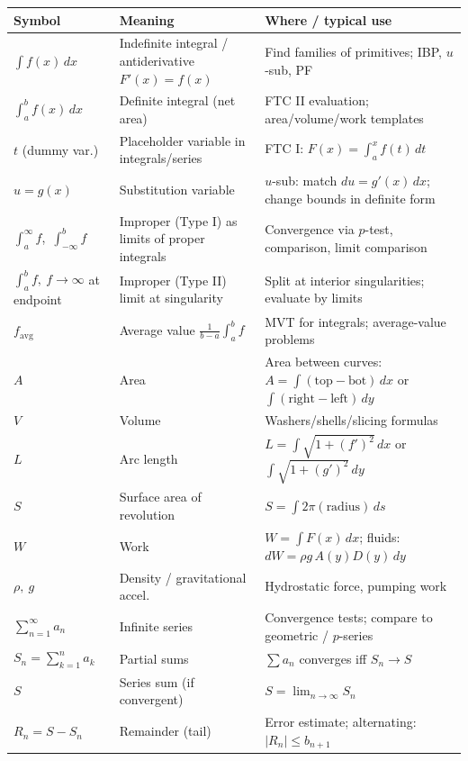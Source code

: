 \documentclass[12pt]{article}
\begin{document}
\begin{center}
\footnotesize
\begin{tabular}{@{}p{}p{}p{}@{}}
\toprule
\textbf{Symbol} & \textbf{Meaning} & \textbf{Where / typical use} \\
\midrule
$\displaystyle \int f(x)\,dx$ & Indefinite integral / antiderivative $F'(x)=f(x)$ & Find families of primitives; IBP, $u$-sub, PF \\
$\displaystyle \int_a^b f(x)\,dx$ & Definite integral (net area) & FTC II evaluation; area/volume/work templates \\
$t$ (dummy var.) & Placeholder variable in integrals/series & FTC I: $F(x)=\int_a^x f(t)\,dt$ \\
$u=g(x)$ & Substitution variable & $u$-sub: match $du=g'(x)\,dx$; change bounds in definite form \\
$\displaystyle \int_a^{\infty} f$,\ $\int_{-\infty}^b f$ & Improper (Type I) as limits of proper integrals & Convergence via $p$-test, comparison, limit comparison \\
$\displaystyle \int_a^b f,\ f\to\infty$ at endpoint & Improper (Type II) limit at singularity & Split at interior singularities; evaluate by limits \\
$f_{\text{avg}}$ & Average value $\frac{1}{b-a}\int_a^b f$ & MVT for integrals; average-value problems \\
$A$ & Area & Area between curves: $A=\int(\text{top}-\text{bot})\,dx$ or $\int(\text{right}-\text{left})\,dy$ \\
$V$ & Volume & Washers/shells/slicing formulas \\
$L$ & Arc length & $L=\int\sqrt{1+(f')^2}\,dx$ or $\int\sqrt{1+(g')^2}\,dy$ \\
$S$ & Surface area of revolution & $S=\int 2\pi(\text{radius})\,ds$ \\
$W$ & Work & $W=\int F(x)\,dx$; fluids: $dW=\rho g\,A(y)D(y)\,dy$ \\
$\rho,\ g$ & Density / gravitational accel. & Hydrostatic force, pumping work \\
$\sum_{n=1}^{\infty} a_n$ & Infinite series & Convergence tests; compare to geometric / $p$-series \\
$S_n=\sum_{k=1}^{n} a_k$ & Partial sums & $\sum a_n$ converges iff $S_n\to S$ \\
$S$ & Series sum (if convergent) & $S=\lim_{n\to\infty}S_n$ \\
$R_n=S-S_n$ & Remainder (tail) & Error estimate; alternating: $|R_n|\le b_{n+1}$ \\

\end{tabular}
\end{center}
\end{document}
